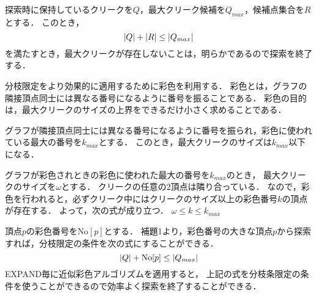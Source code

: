 探索時に保持しているクリークを$Q$，最大クリーク候補を$Q_{max}$，候補点集合を$R$とする．
このとき，
\begin{equation}
	|Q| + |R| \leq |Q_{max}|
\notag
\end{equation}
を満たすとき，最大クリークが存在しないことは，明らかであるので探索を終了する．


分枝限定をより効果的に適用するために彩色を利用する．
彩色とは，グラフの隣接頂点同士には異なる番号になるように番号を振ることである．
彩色の目的は，最大クリークのサイズの上界をできるだけ小さく求めることである．

\begin{lemma}[彩色による最大クリークのサイズの上界]
    グラフが隣接頂点同士には異なる番号になるように番号を振られ，彩色に使われている最大の番号を$k_{max}$とする．
    このとき，最大クリークのサイズは$k_{max}$以下になる．
\end{lemma}
\begin{Proof*}
    グラフが彩色されときの彩色に使われた最大の番号を$k_{max}$のとき，
    最大クリークのサイズを$\omega $とする．
    クリークの任意の2頂点は隣り合っている．
    なので，彩色を行われると，必ずクリーク中にはクリークのサイズ以上の彩色番号$k$の頂点が存在する．
    よって，次の式が成り立つ．
	$ \omega \leq k \leq  k_{max}$
   
\end{Proof*}
頂点$p$の彩色番号を$\mathrm{No}[p]$とする．
補題1より，彩色番号の大きな頂点$p$から探索すれば，分枝限定の条件を次の式にすることができる．
\begin{equation}
	|Q| + \mathrm{No}[p] \leq | Q_{max} | 
	\notag
\end{equation}
EXPAND毎に近似彩色アルゴリズムを適用すると，
	上記の式を分枝条限定の条件を使うことができるので効率よく探索を終了することができる．

